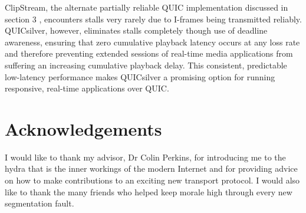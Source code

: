 \documentclass{mpaper}
\begin{document}
ClipStream, the alternate partially reliable QUIC implementation discussed in section 3 \cite{Palmer2018}, encounters stalls very rarely due to I-frames being transmitted reliably. QUICsilver, however, eliminates stalls completely though use of deadline awareness, ensuring that zero cumulative playback latency occurs at any loss rate and therefore preventing extended sessions of real-time media applications from suffering an increasing cumulative playback delay. This consistent, predictable low-latency performance makes QUICsilver a promising option for running responsive, real-time applications over QUIC.


\section{Acknowledgements}

I would like to thank my advisor, Dr Colin Perkins, for introducing me to the hydra that is the inner workings of the modern Internet and for providing advice on how to make contributions to an exciting new transport protocol. I would also like to thank the many friends who helped keep morale high through every new segmentation fault.



\end{document}
